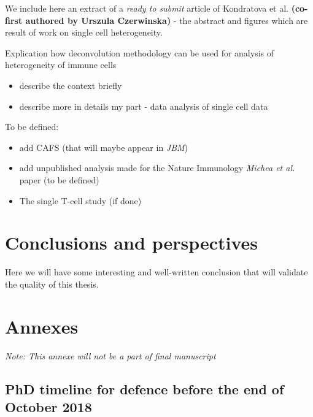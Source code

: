 \documentclass[12pt,]{book}
\providecommand{\tightlist}{%
  \setlength{\itemsep}{0pt}\setlength{\parskip}{0pt}}
\theoremstyle{definition}
\theoremstyle{definition}
\theoremstyle{definition}
\theoremstyle{remark}
\begin{document}
We include here an extract of a \emph{ready to submit} article of
Kondratova et al. \textbf{(co-first authored by Urszula Czerwinska)} -
the abstract and figures which are result of work on single cell
heterogeneity.

Explication how deconvolution methodology can be used for analysis of
heterogeneity of immune cells

\begin{itemize}
\item
  describe the context briefly
\item
  describe more in details my part - data analysis of single cell data
\end{itemize}

To be defined:

\begin{itemize}
\tightlist
\item
  add CAFS (that will maybe appear in \emph{JBM})
\item
  add unpublished analysis made for the Nature Immunology \emph{Michea
  et al.} paper (to be defined)
\item
  The single T-cell study (if done)
\end{itemize}



\hypertarget{conclusions}{%
\chapter{Conclusions and perspectives}\label{conclusions}}

Here we will have some interesting and well-written conclusion that will
validate the quality of this thesis.

\hypertarget{annexes}{%
\chapter*{Annexes}\label{annexes}}

\emph{Note: This annexe will not be a part of final manuscript}

\hypertarget{phd-timeline-for-defence-before-the-end-of-october-2018}{%
\section*{PhD timeline for defence before the end of October
2018}\label{phd-timeline-for-defence-before-the-end-of-october-2018}}
\end{document}
